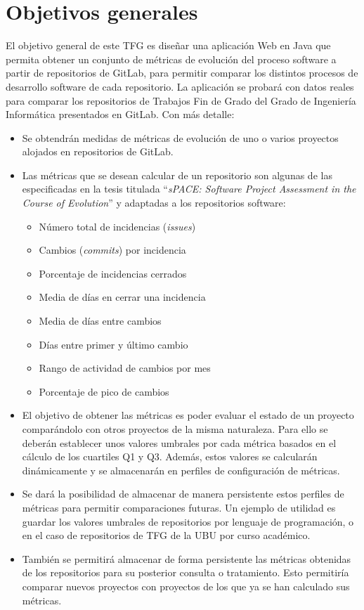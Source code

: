 \section{Objetivos generales}
El objetivo general de este TFG es diseñar una aplicación Web en Java que permita obtener un conjunto de métricas de evolución del proceso software a partir de repositorios de GitLab, para permitir comparar los distintos procesos de desarrollo software de cada repositorio. La aplicación se probará con datos reales para comparar los repositorios de Trabajos Fin de Grado del Grado de Ingeniería Informática presentados en GitLab. Con más detalle:
\begin{itemize}
	\tightlist
	\item Se obtendrán medidas de métricas de evolución de uno o varios proyectos alojados en repositorios de GitLab.
	\item Las métricas que se desean calcular de un repositorio  son algunas de las especificadas en la tesis titulada ``\textit{sPACE: Software Project Assessment in the Course of Evolution}'' \citep{ratzinger_space:_2007} y 
	adaptadas a los repositorios software:
	\begin{itemize}
		\tightlist
		\item Número total de incidencias (\textit{issues})
		\item Cambios (\textit{commits}) por incidencia
		\item Porcentaje de incidencias cerrados
		\item Media de días en cerrar una incidencia
		\item Media de días entre cambios
		\item Días entre primer y último cambio
		\item Rango de actividad de cambios por mes
		\item Porcentaje de pico de cambios
	\end{itemize}
	\item El objetivo de obtener las métricas es poder evaluar el estado de un proyecto comparándolo con otros proyectos de la misma naturaleza. Para ello se deberán establecer unos valores umbrales por cada métrica basados en el cálculo de los cuartiles Q1 y Q3. Además, estos valores se calcularán dinámicamente y se almacenarán en perfiles de configuración de métricas.
	\item Se dará la posibilidad de almacenar de manera persistente estos perfiles de métricas para permitir comparaciones futuras. Un ejemplo de utilidad es guardar los valores umbrales de repositorios por lenguaje de programación, o en el caso de repositorios de TFG de la UBU por curso académico.
	\item También se permitirá almacenar de forma persistente las métricas obtenidas de los repositorios para su posterior consulta o tratamiento. Esto permitiría comparar nuevos proyectos con proyectos de los que ya se han calculado sus métricas.
\end{itemize}

